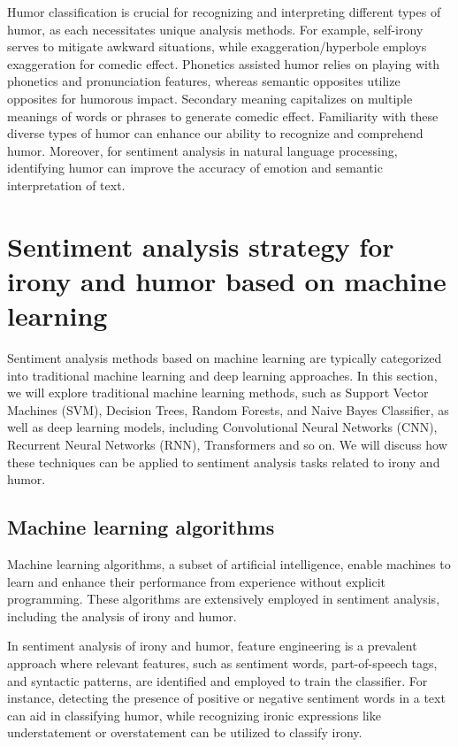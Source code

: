 \documentclass[a4paper]{article}
\begin{document}
Humor classification is crucial for recognizing and interpreting different types of humor, as each necessitates unique analysis methods. For example, self-irony serves to mitigate awkward situations, while exaggeration/hyperbole employs exaggeration for comedic effect. Phonetics assisted humor relies on playing with phonetics and pronunciation features, whereas semantic opposites utilize opposites for humorous impact. Secondary meaning capitalizes on multiple meanings of words or phrases to generate comedic effect. Familiarity with these diverse types of humor can enhance our ability to recognize and comprehend humor. Moreover, for sentiment analysis in natural language processing, identifying humor can improve the accuracy of emotion and semantic interpretation of text.

\section{Sentiment analysis strategy for irony and humor based on machine learning}

Sentiment analysis methods based on machine learning are typically categorized into traditional machine learning and deep learning approaches. In this section, we will explore traditional machine learning methods, such as Support Vector Machines (SVM), Decision Trees, Random Forests, and Naive Bayes Classifier, as well as deep learning models, including Convolutional Neural Networks (CNN), Recurrent Neural Networks (RNN), Transformers and so on. We will discuss how these techniques can be applied to sentiment analysis tasks related to irony and humor.

\subsection{Machine learning algorithms}

Machine learning algorithms, a subset of artificial intelligence, enable machines to learn and enhance their performance from experience without explicit programming. These algorithms are extensively employed in sentiment analysis, including the analysis of irony and humor.

In sentiment analysis of irony and humor, feature engineering is a prevalent approach where relevant features, such as sentiment words, part-of-speech tags, and syntactic patterns, are identified and employed to train the classifier. For instance, detecting the presence of positive or negative sentiment words in a text can aid in classifying humor, while recognizing ironic expressions like understatement or overstatement can be utilized to classify irony.
\end{document}
